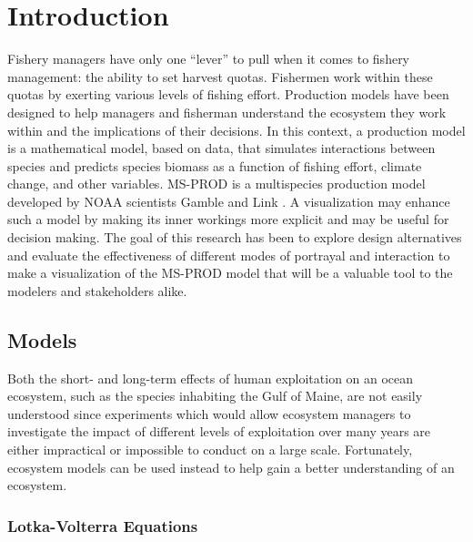 %

\chapter{Introduction}                %

\renewcommand{\thepart}{{\Roman{part}}}				%

Fishery managers have only one ``lever'' to pull when it comes to fishery management: the ability to set harvest quotas.  Fishermen work within these quotas by exerting various levels of fishing effort.  Production models have been designed to help managers and fisherman understand the ecosystem they work within and the implications of their decisions.  In this context, a production model is a mathematical model, based on data, that simulates interactions between species and predicts species biomass as a function of fishing effort, climate change, and other variables.  MS-PROD is a multispecies production model developed by NOAA scientists Gamble and Link \citeyearpar{gamble2009}.  A visualization may enhance such a model by making its inner workings more explicit and may be useful for decision making. The goal of this research has been to explore design alternatives and evaluate the effectiveness of different modes of portrayal and interaction to make a visualization of the MS-PROD model that will be a valuable tool to the modelers and stakeholders alike. 

\section{Models}

Both the short- and long-term effects of human exploitation on an ocean ecosystem, such as the species inhabiting the Gulf of Maine, are not easily understood since experiments which would allow ecosystem managers to investigate the impact of different levels of exploitation over many years are either impractical or impossible to conduct on a large scale.  Fortunately, ecosystem models can be used instead to help gain a better understanding of an ecosystem.

\subsection{Lotka-Volterra Equations}

